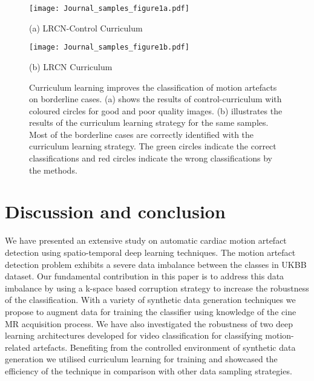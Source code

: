 \documentclass[preprint,12pt,authoryear]{elsarticle}
\begin{document}
 \begin{figure}

\begin{minipage}[b]{\linewidth}
  \centering
  \centerline{\texttt{[image: Journal\_samples\_figure1a.pdf]}}
  \centerline{(a) LRCN-Control Curriculum}\medskip
  \label{fig:Cursamplesa}
\end{minipage}
\hfill
\begin{minipage}[b]{\linewidth}
  \centering
  \centerline{\texttt{[image: Journal\_samples\_figure1b.pdf]}}
  \centerline{(b) LRCN Curriculum}\medskip
  \label{fig:Cursamplesb}
\end{minipage}
\hfill

\caption{Curriculum learning improves the classification of motion artefacts on borderline cases. (a) shows the results of control-curriculum with coloured circles for good and poor quality images.  (b) illustrates the results of the curriculum learning  strategy for the same samples. Most of the borderline cases are correctly identified with the curriculum learning strategy. The green circles indicate the correct classifications and red circles indicate the wrong classifications by the methods.}
\label{fig:Cursamples}
%
\end{figure}


\section{Discussion and conclusion}
\label{sec:discussion_conclusion}

We have presented an extensive study on automatic cardiac motion artefact detection using spatio-temporal deep learning techniques. The motion artefact detection problem exhibits a severe data imbalance between the classes in UKBB dataset. Our fundamental contribution in this paper is to address this data imbalance by using a k-space based corruption strategy to increase the robustness of the classification. With a variety of synthetic data generation techniques we propose to augment data for training the classifier using knowledge of the cine MR acquisition process. We have also investigated the robustness of two deep learning architectures developed for video classification for classifying motion-related artefacts.
Benefiting from the controlled environment of synthetic data generation we utilised curriculum learning for training and showcased the efficiency of the technique in comparison with other data sampling strategies. \\
\end{document}
